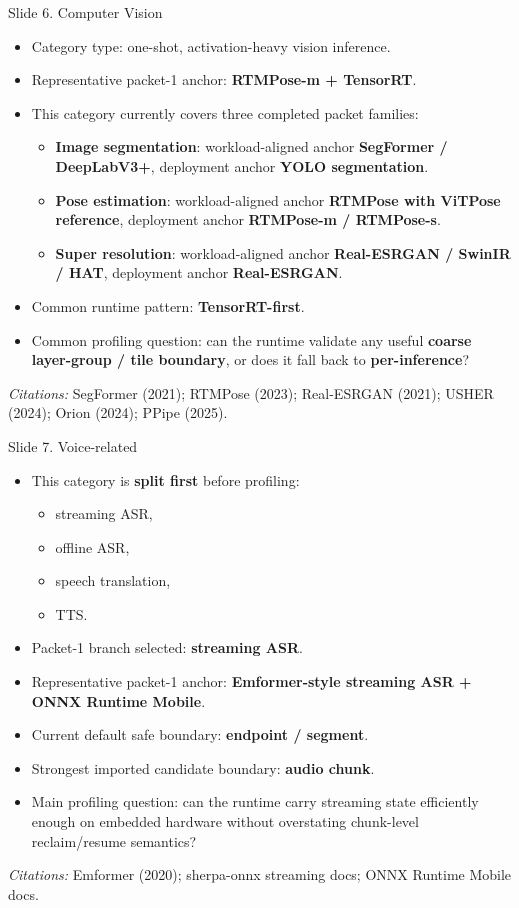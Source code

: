 \documentclass[aspectratio=169]{beamer}
\newcommand{\slidecite}[1]{\vspace{0.35em}\par{\tiny\raggedright\textit{Citations: }#1\par}}
\begin{document}
\begin{frame}[t,shrink=9]{Slide 6. Computer Vision}
\small
\begin{itemize}
  \item Category type: one-shot, activation-heavy vision inference.
  \item Representative packet-1 anchor: \textbf{RTMPose-m + TensorRT}.
  \item This category currently covers three completed packet families:
  \begin{itemize}
    \item \textbf{Image segmentation}: workload-aligned anchor \textbf{SegFormer / DeepLabV3+}, deployment anchor \textbf{YOLO segmentation}.
    \item \textbf{Pose estimation}: workload-aligned anchor \textbf{RTMPose with ViTPose reference}, deployment anchor \textbf{RTMPose-m / RTMPose-s}.
    \item \textbf{Super resolution}: workload-aligned anchor \textbf{Real-ESRGAN / SwinIR / HAT}, deployment anchor \textbf{Real-ESRGAN}.
  \end{itemize}
  \item Common runtime pattern: \textbf{TensorRT-first}.
  \item Common profiling question: can the runtime validate any useful \textbf{coarse layer-group / tile boundary}, or does it fall back to \textbf{per-inference}?
\end{itemize}
\slidecite{SegFormer (2021); RTMPose (2023); Real-ESRGAN (2021); USHER (2024); Orion (2024); PPipe (2025).}
\end{frame}

\begin{frame}[t]{Slide 7. Voice-related}
\small
\begin{itemize}
  \item This category is \textbf{split first} before profiling:
  \begin{itemize}
    \item streaming ASR,
    \item offline ASR,
    \item speech translation,
    \item TTS.
  \end{itemize}
  \item Packet-1 branch selected: \textbf{streaming ASR}.
  \item Representative packet-1 anchor: \textbf{Emformer-style streaming ASR + ONNX Runtime Mobile}.
  \item Current default safe boundary: \textbf{endpoint / segment}.
  \item Strongest imported candidate boundary: \textbf{audio chunk}.
  \item Main profiling question: can the runtime carry streaming state efficiently enough on embedded hardware without overstating chunk-level reclaim/resume semantics?
\end{itemize}
\slidecite{Emformer (2020); sherpa-onnx streaming docs; ONNX Runtime Mobile docs.}
\end{frame}
\end{document}
